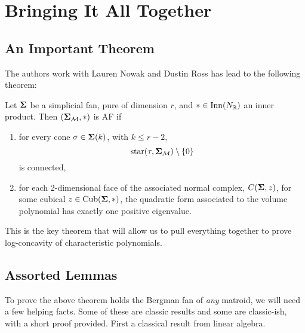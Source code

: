 \documentclass[12pt,oneside]{../../sfsuthesis}
\begin{document}
\chapter{Bringing It All Together}


\section{An Important Theorem}

The authors work with Lauren Nowak and Dustin Ross has lead to the following theorem:

\begin{theorem}\th\label{thm:suffAF}
    Let \( \bm{\Sigma} \) be a simplicial  fan, pure of dimension \( r \), and \( \ast \in \mathrm{Inn}(N_{\mathbb{R}}) \) an inner product.
    Then \( (\bm{\Sigma}_{\mathcal{M}}, \ast) \) is AF if
    \begin{enumerate}[label=\roman*.]
        \item for every cone \( \sigma \in \bm{\Sigma}(k) \), with \( k \leq r - 2 \),
              \[
                  \operatorname{star}(\tau, \bm{\Sigma}_{\mathcal{M}}) \setminus \{ 0 \}
              \]
              is connected,
        \item for each 2-dimensional face of the associated normal complex, \( C(\bm{\Sigma}, z) \), for some cubical \( z \in \operatorname{Cub}(\bm{\Sigma}, \ast) \), the quadratic form associated to the volume polynomial has exactly one positive eigenvalue.
    \end{enumerate}
\end{theorem}

This is the key theorem that will allow us to pull everything together to prove log-concavity of characteristic polynomials.

\section{Assorted Lemmas}

To prove the above theorem holds the Bergman fan of \textit{any} matroid, we will need a few helping facts.
Some of these are classic results and some are classic-ish, with a short proof provided.
First a classical result from linear algebra.
\end{document}
